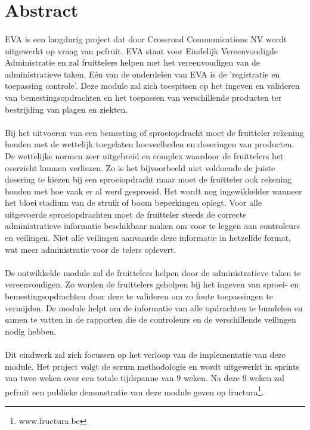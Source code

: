 \section* {Abstract}

\paragraph {} EVA is een langdurig project dat door Crossroad Communications NV wordt
uitgewerkt op vraag van pcfruit. EVA staat voor Eindelijk Vereenvoudigde Administratie en
zal fruittelers helpen met het vereenvoudigen van de administratieve taken. Eén van de
onderdelen van EVA is de 'registratie en toepassing controle'. Deze module zal zich
toespitsen op het ingeven en valideren van bemestingsopdrachten en het toepassen van
verschillende producten ter bestrijding van plagen en ziekten.

\paragraph {} Bij het uitvoeren van een bemesting of sproeiopdracht moet de fruitteler rekening
houden met de wettelijk toegelaten hoeveelheden en doseringen van producten. De wettelijke
normen zeer uitgebreid en complex waardoor de fruittelers het overzicht kunnen
verliezen. Zo is het bijvoorbeeld niet voldoende de juiste dosering te kiezen bij een
sproeiopdracht maar moet de fruitteler ook rekening houden met hoe vaak er al werd gesproeid.
Het wordt nog
ingewikkelder wanneer het bloei stadium van de struik of boom beperkingen oplegt. Voor alle
uitgevoerde sproeiopdrachten moet de fruitteler steeds de correcte administratieve informatie
beschikbaar maken om voor te leggen aan controleurs en veilingen. Niet alle veilingen
aanvaarde deze informatie in hetzelfde format, wat meer administratie voor de telers
oplevert.

\paragraph {} De ontwikkelde module zal de fruittelers helpen door de administratieve taken te
vereenvoudigen. Zo worden de fruittelers geholpen bij het ingeven van sproei- en
bemestingsopdrachten door deze te valideren om zo foute toepassingen te vermijden. De
module helpt om de informatie van alle opdrachten te bundelen en samen te vatten in de
rapporten die de controleurs en de verschillende veilingen nodig hebben.

\paragraph {} Dit eindwerk zal zich focussen op het verloop van de implementatie van deze
module. Het project volgt de scrum methodologie en wordt uitgewerkt in sprints van twee
weken over een totale tijdspanne van 9 weken. Na deze 9 weken zal pcfruit een publieke
demonstratie van deze module geven op fructura\footnote{www.fructura.be}.

